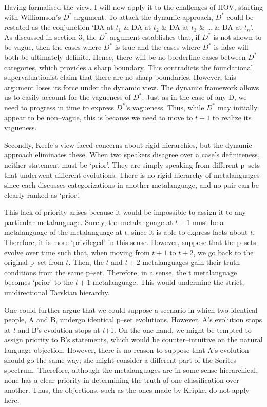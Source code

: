 Having formalised the view, I will now apply it to the challenges of
HOV, starting with Williamson's $D^*$ argument. To attack the dynamic
approach, $D^*$ could be restated as the conjunction `DA at \(t_{1}\) \& DA
at \(t_{2}\) \& DA at \(t_{3}\) \& \ldots{} \& DA at \(t_{n}\)'. As
discussed in section 3, the $D^*$ argument establishes that, if $D^*$ is not
shown to be vague, then the cases where $D^*$ is true and the cases where
$D^*$ is false will both be ultimately definite. Hence, there will be no
borderline cases between $D^*$ categories, which provides a sharp boundary.
This contradicts the foundational supervaluationist claim that there are
no sharp boundaries. However, this argument loses its force under the
dynamic view. The dynamic framework allows us to easily account for the
vagueness of $D^*$. Just as in the case of any D, we need to progress in
time to express $D^*$'s vagueness. Thus, while $D^*$ may initially appear to
be non--vague, this is because we need to move to $t + 1$ to realize its
vagueness.

Secondly, Keefe's view faced concerns about rigid hierarchies, but the
dynamic approach eliminates these. When two speakers disagree over a
case's definiteness, neither statement must be `prior'. They are simply
speaking from different p--sets that underwent different evolutions.
There is no rigid hierarchy of metalanguages since each discusses
categorizations in another metalanguage, and no pair can be clearly
ranked as `prior'.

This lack of priority arises because it would be impossible to assign it
to any particular metalanguage. Surely, the metalanguage at $t+1$
must be a metalanguage of the metalanguage at $t$, since it is able
to express facts about $t$. Therefore, it is more `privileged' in
this sense. However, suppose that the p--sets evolve over time such that,
when moving from $t+1$ to $t+2$, we go back to the original
p--set from $t$. Then, the $t$ and $t+2$ metalanguages
gain their truth conditions from the same p--set. Therefore, in a sense,
the t metalanguage becomes `prior' to the $t+1$ metalanguage. This
would undermine the strict, unidirectional Tarskian hierarchy.

One could further argue that we could suppose a scenario in which two
identical people, A and B, undergo identical p--set evolutions. However,
A's evolution stops at \emph{t} and B's evolution stops at \emph{t}+1.
On the one hand, we might be tempted to assign priority to B's
statements, which would be counter--intuitive on the natural language
objection. However, there is no reason to suppose that A's evolution
should go the same way; she might consider a different part of the
Sorites spectrum. Therefore, although the metalanguages are in some
sense hierarchical, none has a clear priority in determining the truth
of one classification over another. Thus, the objections, such as the
ones made by Kripke, do not apply here.

